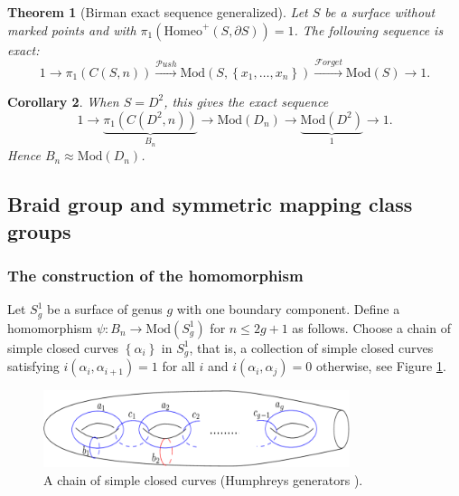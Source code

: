 \documentclass[reqno]{amsart}
\newtheorem{theorem}{Theorem}[section]
\newtheorem{corollary}[theorem]{Corollary}
\theoremstyle{definition}
\theoremstyle{remark}
\newcommand{\Mod}{{\mathrm{Mod}}}
\newcommand{\Homeo}{{\mathrm{Homeo}}}
\newcommand{\Push}{{\mathcal{P}}ush}
\newcommand{\Forget}{{\mathcal{F}}orget}
\begin{document}
 \begin{theorem}[Birman exact sequence generalized]
     Let $S$ be a surface without marked points
     and with $\pi_1 \left( \Homeo^{+} \left( 
     S, \partial S\right)  \right) = 1$. The following
     sequence is exact:
     \[
     1 \to \pi_1 \left( C \left( S,n \right)  \right) 
     \stackrel{\Push}{\to } \Mod \left( S,
     \left\{ x_1, \ldots, x_n \right\} \right) 
     \stackrel{\Forget}{\to } \Mod (S) \to 1.
     \] 
 \end{theorem}


 \begin{corollary}
     When $S = D^2$, this gives the exact sequence
     \[
         1 \to
         \underbrace{\pi_1 \left( C \left( D^2,n \right)\right)}_{B_n}
     \to \Mod \left( D_n \right) \to 
     \underbrace{\Mod \left( D^2 \right)}_{1} \to 1.
     \] 
     Hence $B_n \approx \Mod \left( D_n \right) $.
 \end{corollary}


 \newpage



 \subsection{Braid group and symmetric mapping class groups}

 \subsubsection{The construction of the
 homomorphism}\label{birman-hilden-embedding-construction}

 Let $S_{g}^{1}$ be a surface of genus $g$ with
 one boundary component. Define a
 homomorphism $\psi \colon B_n \to 
 \Mod \left( S_g^{1} \right) $ for
 $n \le 2g+1$ as follows.
 Choose a chain of simple closed curves
 $\left\{ \alpha_i \right\} $ in
 $S_{g}^{1}$, that is, a collection of
 simple closed curves satisfying
 $i \left( \alpha_i, \alpha_{i+1} \right) =1$ for
 all $i$ and $i \left( \alpha_i, \alpha_j \right) =0$ otherwise,
 see Figure \ref{fig:Humphreys-generators-png}.

 \begin{figure}[htpb]
     \centering
     \includegraphics[width=0.8\textwidth]{Humphreys-generators.png}
     \caption{A chain of simple closed curves (Humphreys generators ).
     }
     \label{fig:Humphreys-generators-png}
 \end{figure}
\end{document}
